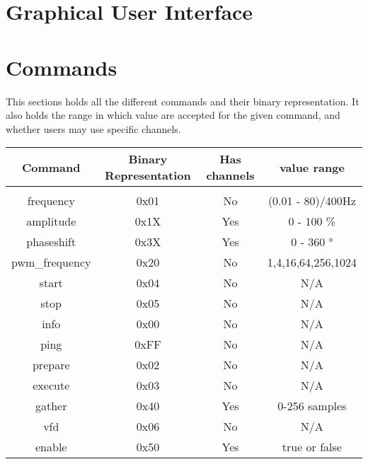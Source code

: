 \documentclass{article}
\begin{document}
\section{Graphical User Interface}

\section{Commands}
\label{sec:Commands}
This sections holds all the different commands and their binary representation.
It also holds the range in which value are accepted for the given command, and whether
users may use specific channels.\newline
\begin{tabular}{c c c c}
	\hline
	Command & Binary Representation & Has channels & value range\\
	\hline \hline \\
	frequency & 0x01 & No & (0.01 - 80)/400\si{\hertz}\\
	amplitude & 0x1X & Yes & 0 - 100 \si{\percent}\\
	phaseshift & 0x3X & Yes & 0 - 360 \si{\degree}\\
	pwm\_frequency & 0x20 & No & 1,4,16,64,256,1024 \\
	start & 0x04 & No & N/A \\
	stop & 0x05 & No & N/A \\
	info & 0x00 & No & N/A \\
	ping & 0xFF & No & N/A \\
	prepare & 0x02 & No & N/A \\
	execute & 0x03 & No & N/A \\
	gather & 0x40 & Yes & 0-256 samples \\
	vfd & 0x06 & No & N/A \\
	enable & 0x50 & Yes & true or false \\
	\hline
\end{tabular}
\end{document}
